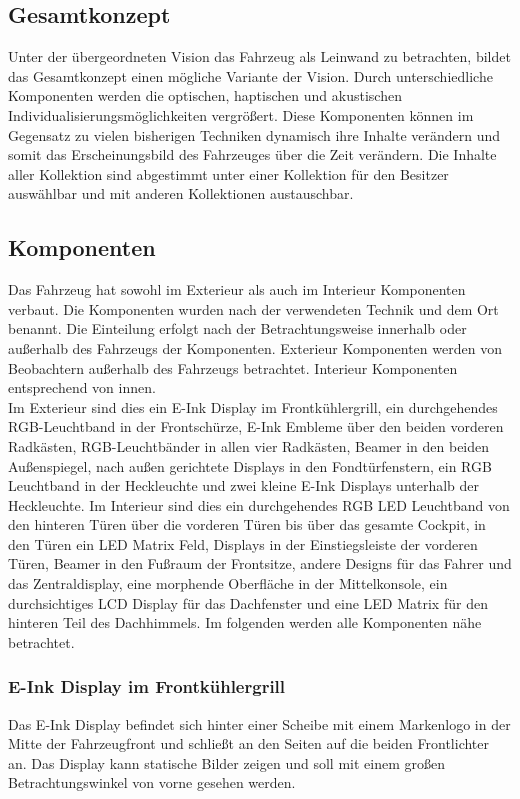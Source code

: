 \subsection{Gesamtkonzept}
Unter der übergeordneten Vision das Fahrzeug als Leinwand zu betrachten, bildet das Gesamtkonzept einen mögliche Variante der Vision. 
Durch unterschiedliche Komponenten werden die optischen, haptischen und akustischen Individualisierungsmöglichkeiten vergrößert. Diese Komponenten können im Gegensatz zu vielen bisherigen Techniken dynamisch ihre Inhalte verändern und somit das Erscheinungsbild des Fahrzeuges über die Zeit verändern. Die Inhalte aller Kollektion sind abgestimmt unter einer Kollektion für den Besitzer auswählbar und mit anderen Kollektionen austauschbar.
\subsection{Komponenten}
Das Fahrzeug hat sowohl im Exterieur als auch im Interieur Komponenten verbaut. Die Komponenten wurden nach der verwendeten Technik und dem Ort benannt. Die Einteilung erfolgt nach der Betrachtungsweise innerhalb oder außerhalb des Fahrzeugs der Komponenten. Exterieur Komponenten werden von Beobachtern außerhalb des Fahrzeugs betrachtet. Interieur Komponenten entsprechend von innen.\\
Im Exterieur sind dies ein E-Ink Display im Frontkühlergrill, ein durchgehendes RGB-Leuchtband in der Frontschürze, E-Ink Embleme über den beiden vorderen Radkästen, RGB-Leuchtbänder in allen vier Radkästen, Beamer in den beiden Außenspiegel, nach außen gerichtete Displays in den Fondtürfenstern, ein RGB Leuchtband in der Heckleuchte und zwei kleine E-Ink Displays unterhalb der Heckleuchte.
Im Interieur sind dies ein durchgehendes RGB LED Leuchtband von den hinteren Türen über die vorderen Türen bis über das gesamte Cockpit, in den Türen ein LED Matrix Feld, Displays in der Einstiegsleiste der vorderen Türen, Beamer in den Fußraum der Frontsitze, andere Designs für das Fahrer und das Zentraldisplay, eine morphende Oberfläche in der Mittelkonsole, ein durchsichtiges LCD Display für das Dachfenster und eine LED Matrix für den hinteren Teil des Dachhimmels.
Im folgenden werden alle Komponenten nähe betrachtet.
\subsubsection{E-Ink Display im Frontkühlergrill}
Das E-Ink Display befindet sich hinter einer Scheibe mit einem Markenlogo in der Mitte der Fahrzeugfront und schließt an den Seiten auf die beiden Frontlichter an. Das Display kann statische Bilder zeigen und soll mit einem großen Betrachtungswinkel von vorne gesehen werden.
